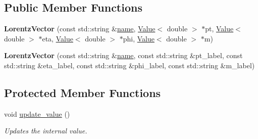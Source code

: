 \subsection*{Public Member Functions}
\begin{DoxyCompactItemize}
\item 
\hypertarget{classfv_1_1root_1_1LorentzVector_ae8b26e2d7e4205f1de64ec329f31e263}{}\label{classfv_1_1root_1_1LorentzVector_ae8b26e2d7e4205f1de64ec329f31e263} 
{\bfseries Lorentz\+Vector} (const std\+::string \&\hyperlink{classfv_1_1GenValue_a610f89ee441eaad4c9e78f74d6bde93b}{name}, \hyperlink{classfv_1_1Value}{Value}$<$ double $>$ $\ast$pt, \hyperlink{classfv_1_1Value}{Value}$<$ double $>$ $\ast$eta, \hyperlink{classfv_1_1Value}{Value}$<$ double $>$ $\ast$phi, \hyperlink{classfv_1_1Value}{Value}$<$ double $>$ $\ast$m)
\item 
\hypertarget{classfv_1_1root_1_1LorentzVector_a4a3a2b3c1e28d4680a88351c6f342779}{}\label{classfv_1_1root_1_1LorentzVector_a4a3a2b3c1e28d4680a88351c6f342779} 
{\bfseries Lorentz\+Vector} (const std\+::string \&\hyperlink{classfv_1_1GenValue_a610f89ee441eaad4c9e78f74d6bde93b}{name}, const std\+::string \&pt\+\_\+label, const std\+::string \&eta\+\_\+label, const std\+::string \&phi\+\_\+label, const std\+::string \&m\+\_\+label)
\end{DoxyCompactItemize}
\subsection*{Protected Member Functions}
\begin{DoxyCompactItemize}
\item 
void \hyperlink{classfv_1_1root_1_1LorentzVector_aeb17320a2024bd189dad4117cf1f54fb}{update\+\_\+value} ()
\begin{DoxyCompactList}\small\item\em Updates the internal value. \end{DoxyCompactList}\end{DoxyCompactItemize}
